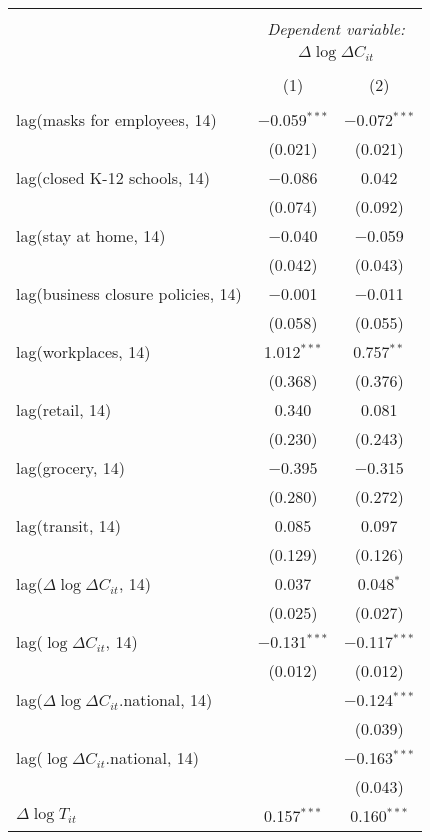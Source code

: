 \begin{tabular}{@{\extracolsep{1pt}}lcc} 
\\[-1.8ex]\hline 
\hline \\[-1.8ex] 
 & \multicolumn{2}{c}{\textit{Dependent variable:}} \\ 
\cline{2-3} 
 & \multicolumn{2}{c}{$\Delta \log \Delta C_{it}$} \\ 
\\[-1.8ex] & (1) & (2)\\ 
\hline \\[-1.8ex] 
 lag(masks for employees, 14) & $-$0.059$^{***}$ & $-$0.072$^{***}$ \\ 
  & (0.021) & (0.021) \\ 
  lag(closed K-12 schools, 14) & $-$0.086 & 0.042 \\ 
  & (0.074) & (0.092) \\ 
  lag(stay at home, 14) & $-$0.040 & $-$0.059 \\ 
  & (0.042) & (0.043) \\ 
  lag(business closure policies, 14) & $-$0.001 & $-$0.011 \\ 
  & (0.058) & (0.055) \\ 
  lag(workplaces, 14) & 1.012$^{***}$ & 0.757$^{**}$ \\ 
  & (0.368) & (0.376) \\ 
  lag(retail, 14) & 0.340 & 0.081 \\ 
  & (0.230) & (0.243) \\ 
  lag(grocery, 14) & $-$0.395 & $-$0.315 \\ 
  & (0.280) & (0.272) \\ 
  lag(transit, 14) & 0.085 & 0.097 \\ 
  & (0.129) & (0.126) \\ 
  lag($\Delta \log \Delta C_{it}$, 14) & 0.037 & 0.048$^{*}$ \\ 
  & (0.025) & (0.027) \\ 
  lag($\log \Delta C_{it}$, 14) & $-$0.131$^{***}$ & $-$0.117$^{***}$ \\ 
  & (0.012) & (0.012) \\ 
  lag($\Delta \log \Delta C_{it}$.national, 14) &  & $-$0.124$^{***}$ \\ 
  &  & (0.039) \\ 
  lag($\log \Delta C_{it}$.national, 14) &  & $-$0.163$^{***}$ \\ 
  &  & (0.043) \\ 
  $\Delta \log T_{it}$ & 0.157$^{***}$ & 0.160$^{***}$ \\ 

\end{tabular}
